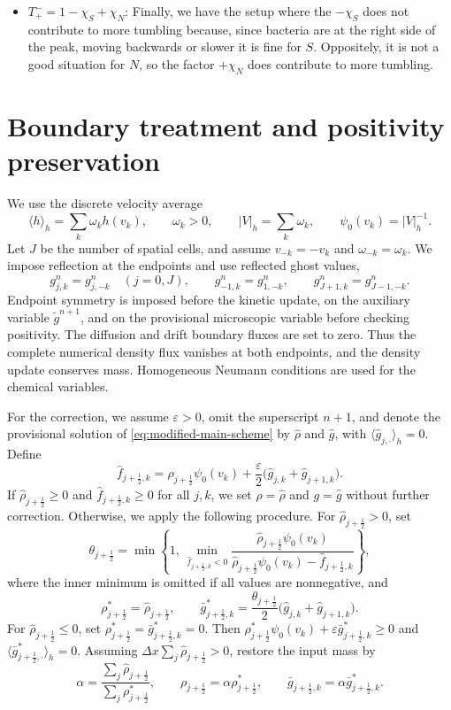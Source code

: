 \documentclass[11pt,twoside]{article}
\numberwithin{equation}{section}
\theoremstyle{plain}
\theoremstyle{nonumberplain}
\begin{document}
{\begin{itemize}
    \item $T^-_+ = 1-\chi_S+\chi_N$: Finally, we have the setup where the $-\chi_S$ does not contribute to more tumbling because, since bacteria are at the right side of the peak, moving backwards or slower it is fine for $S$. Oppositely, it is not a good situation for $N$, so the factor $+\chi_N$ does contribute to more tumbling.
\end{itemize}
\fi

\section{Boundary treatment and positivity preservation}
\label{sec:limiter}
We use the discrete velocity average
\[
\langle h\rangle_h=\sum_{k}\omega_k h(v_k),
\qquad \omega_k>0,\qquad
|V|_h=\sum_{k}\omega_k,\qquad
\psi_0(v_k)=|V|_h^{-1}.
\]
Let $J$ be the number of spatial cells, and assume
$v_{-k}=-v_k$ and $\omega_{-k}=\omega_k$.
We impose reflection at the endpoints and use reflected ghost values,
\[
g_{j,k}^n=g_{j,-k}^n\quad(j=0,J),\qquad
g_{-1,k}^n=g_{1,-k}^n,\qquad
g_{J+1,k}^n=g_{J-1,-k}^n.
\]
Endpoint symmetry is imposed before the kinetic update, on the
auxiliary variable $\widetilde g^{n+1}$, and on the provisional
microscopic variable before checking positivity.
The diffusion and drift boundary fluxes are set to zero.
Thus the complete numerical density flux vanishes at both endpoints,
and the density update conserves mass.
Homogeneous Neumann conditions are used for the chemical variables.

For the correction, we assume $\varepsilon>0$, omit the superscript $n+1$,
and denote the provisional solution of
\eqref{eq:modified-main-scheme} by $\widehat\rho$ and $\widehat g$,
with $\langle\widehat g_{j,\cdot}\rangle_h=0$.
Define
\[
\widehat f_{j+\frac12,k}
=\widehat\rho_{j+\frac12}\psi_0(v_k)
+\frac{\varepsilon}{2}
 \bigl(\widehat g_{j,k}+\widehat g_{j+1,k}\bigr).
\]
If $\widehat\rho_{j+\frac12}\ge0$ and
$\widehat f_{j+\frac12,k}\ge0$ for all $j,k$,
we set $\rho=\widehat\rho$ and $g=\widehat g$
without further correction.
Otherwise, we apply the following procedure.
For $\widehat\rho_{j+\frac12}>0$, set
\[
\theta_{j+\frac12}
=\min\left\{1,\,
\min_{\widehat f_{j+\frac12,k}<0}
\frac{\widehat\rho_{j+\frac12}\psi_0(v_k)}
{\widehat\rho_{j+\frac12}\psi_0(v_k)-\widehat f_{j+\frac12,k}}
\right\},
\]
where the inner minimum is omitted if all values are nonnegative, and
\[
\rho_{j+\frac12}^{*}=\widehat\rho_{j+\frac12},
\qquad
\bar g_{j+\frac12,k}^{*}
=\frac{\theta_{j+\frac12}}{2}
 \bigl(\widehat g_{j,k}+\widehat g_{j+1,k}\bigr).
\]
For $\widehat\rho_{j+\frac12}\le0$, set
$\rho_{j+\frac12}^{*}=\bar g_{j+\frac12,k}^{*}=0$.
Then $\rho_{j+\frac12}^{*}\psi_0(v_k)
+\varepsilon\bar g_{j+\frac12,k}^{*}\ge0$ and
$\langle\bar g_{j+\frac12,\cdot}^{*}\rangle_h=0$.
Assuming $\Delta x\sum_j\widehat\rho_{j+\frac12}>0$, restore the
input mass by
\[
\alpha=\frac{\sum_j\widehat\rho_{j+\frac12}}
                 {\sum_j\rho_{j+\frac12}^{*}},
\qquad
\rho_{j+\frac12}=\alpha\rho_{j+\frac12}^{*},
\qquad
\bar g_{j+\frac12,k}=\alpha\bar g_{j+\frac12,k}^{*}.
\]

}
\end{document}
